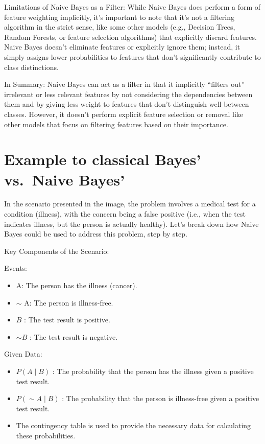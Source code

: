 \documentclass[
  12 pt,
  a4paper,
]{book}
\providecommand{\tightlist}{%
  \setlength{\itemsep}{0pt}\setlength{\parskip}{0pt}}
\numberwithin{equation}{section}
\theoremstyle{plain}      %
\theoremstyle{definition} %
\theoremstyle{remark}     %
\theoremstyle{note}         %
\begin{document}
Limitations of Naive Bayes as a Filter: While Naive Bayes does perform a
form of feature weighting implicitly, it's important to note that it's
not a filtering algorithm in the strict sense, like some other models
(e.g., Decision Trees, Random Forests, or feature selection algorithms)
that explicitly discard features. Naive Bayes doesn't eliminate features
or explicitly ignore them; instead, it simply assigns lower
probabilities to features that don't significantly contribute to class
distinctions.

In Summary: Naive Bayes can act as a filter in that it implicitly
``filters out'' irrelevant or less relevant features by not considering
the dependencies between them and by giving less weight to features that
don't distinguish well between classes. However, it doesn't perform
explicit feature selection or removal like other models that focus on
filtering features based on their importance.

\newpage

\hypertarget{example-to-classical-bayes-vs.-naive-bayes}{%
\section{Example to classical Bayes' vs.~Naive
Bayes'}\label{example-to-classical-bayes-vs.-naive-bayes}}

In the scenario presented in the image, the problem involves a medical
test for a condition (illness), with the concern being a false positive
(i.e., when the test indicates illness, but the person is actually
healthy). Let's break down how Naive Bayes could be used to address this
problem, step by step.

Key Components of the Scenario:

Events:

\begin{itemize}
\tightlist
\item
  A: The person has the illness (cancer).
\item
  \(\sim\) A: The person is illness-free.
\item
  \(B\) : The test result is positive.
\item
  \(\sim B\) : The test result is negative.
\end{itemize}

Given Data:

\begin{itemize}
\tightlist
\item
  \(P(A \mid B)\) : The probability that the person has the illness
  given a positive test result.
\item
  \(P(\sim A \mid B)\) : The probability that the person is illness-free
  given a positive test result.
\item
  The contingency table is used to provide the necessary data for
  calculating these probabilities.
\end{itemize}
\end{document}
